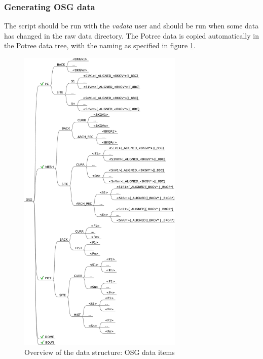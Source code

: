 \subsubsection{Generating OSG data}
\label{sec:generateosg}
The script should be run with the \textit{vadata} user and should be run when some data has
changed in the raw data directory. The Potree data is copied automatically in
the Potree data tree, with the naming as specified in figure
\ref{fig:directory_structure_overview_osg}.
 
\begin{figure}[] \centering
\includegraphics[width=0.7\textwidth]{fig/data_structure/directory_structure_osg}
\caption{Overview of the data structure: OSG data items}
\label{fig:directory_structure_overview_osg} \end{figure}

